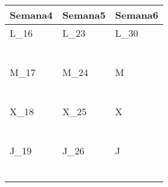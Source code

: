 	\renewcommand{\arraystretch}{1.24}\scriptsize
	\begin{longtabu} to \textwidth { X[l] X[l] X[l]}
		\centering \textbf{Semana4} &  \centering\textbf{Semana5}  &   \centering\textbf{Semana6}  \\
		\toprule
		L_{16} & L_{23} & L_{30} \\
		\makebox{$\square$}\dotfill & \makebox{$\square$}\dotfill & \makebox{$\square$}\dotfill \\
		\dotfill & \dotfill & \dotfill \\
		\makebox{$\square$}\dotfill & \makebox{$\square$}\dotfill & \makebox{$\square$}\dotfill \\
		\dotfill & \dotfill & \dotfill \\
		\makebox{$\square$}\dotfill & \makebox{$\square$}\dotfill & \makebox{$\square$}\dotfill \\
		\dotfill & \dotfill & \dotfill \\

		\hline

		M_{17} & M_{24} & M \\
		\makebox{$\square$}\dotfill & \makebox{$\square$}\dotfill &   \\
		\dotfill & \dotfill &   \\
		\makebox{$\square$}\dotfill & \makebox{$\square$}\dotfill &   \\
		\dotfill & \dotfill &   \\
		\makebox{$\square$}\dotfill & \makebox{$\square$}\dotfill &   \\
		\dotfill & \dotfill &   \\

		\hline

		X_{18} & X_{25} & X \\
		\makebox{$\square$}\dotfill & \makebox{$\square$}\dotfill &   \\
		\dotfill & \dotfill &   \\
		\makebox{$\square$}\dotfill & \makebox{$\square$}\dotfill &   \\
		\dotfill & \dotfill &   \\
		\makebox{$\square$}\dotfill & \makebox{$\square$}\dotfill &   \\
		\dotfill & \dotfill &   \\

		\hline

		J_{19} & J_{26} & J \\
		\makebox{$\square$}\dotfill & \makebox{$\square$}\dotfill &   \\
		\dotfill & \dotfill &   \\
		\makebox{$\square$}\dotfill & \makebox{$\square$}\dotfill &   \\
		\dotfill & \dotfill &   \\
		\makebox{$\square$}\dotfill & \makebox{$\square$}\dotfill &   \\
		\dotfill & \dotfill &   \\


\end{longtabu}
